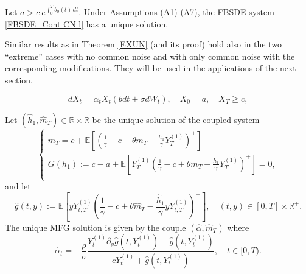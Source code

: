 \documentclass[10pt,a4paper]{amsart}
\begin{document}
\begin{theo}
\label{EXUN} 
Let $a > c \ e^{\int_0^T b_0(t)\, dt}$.    Under Assumptions  (A1)-(A7), the FBSDE system \eqref{FBSDE_Cont CN l} has a unique  solution.
\end{theo}

\begin{rem}
\label{remExun}
Similar results as in Theorem \ref{EXUN} (and its proof) hold also in the two ``extreme'' cases with no common noise and with only common noise with the corresponding modifications. They will be used in the applications of the next section.
\end{rem}

\begin{equation}
\label{sde oi}
    dX_t = \alpha_t X_t (b dt + \sigma dW_t ), \quad X_0=a, \quad X_T \geq c,
\end{equation}

\begin{prop}\label{prop:application1}
Let $(\hat h_1, \hat m_T) \in \mathbb R \times \mathbb R$ be the unique solution of the coupled system 
\begin{equation} \label{eq:h1}
\begin{cases}
 m_T = c + \mathbb{E} \left[ \left( \frac{1}{\gamma}-c+\theta m_T - \frac{h_1}{\gamma} Y_T^{(1)} \right)^{+} \right]\\
    G(h_1):= c -a+ \mathbb{E} \left[ Y_T^{(1)} \left( \frac{1}{\gamma}-c+\theta m_T - \frac{h_1}{\gamma} Y_T^{(1)} \right)^{+} \right]=0,\\
\end{cases}
\end{equation} 
 and let
\[ \hat g(t,y) := \mathbb{E}\!\left[ yY^{(1)}_{t,T} \left(\frac{1}{\gamma}-c+\theta \hat{m}_T- \frac{\hat h_1 }{\gamma}yY^{(1)}_{t,T} \right)^+ \right], \quad (t,y)\in [0,T]\times \mathbb R^+.\]
 The unique MFG solution is given by the couple $(\hat \alpha, \hat m_T)$ where
$$\hat\alpha_t=-\frac{\rho}{\sigma}
\dfrac{Y^{(1)}_t\partial_{y}\hat g(t, Y^{(1)}_t) - \hat g(t,Y^{(1)}_t)}{cY^{(1)}_t+\hat g(t, Y^{(1)}_t)}, \quad t\in [0,T).$$
\end{prop}
\end{document}
